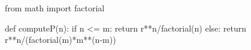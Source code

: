 
from math import factorial

def computeP(n):
    if n <= m:
       return r**n/factorial(n)
    else:
       return r**n/(factorial(m)*m**(n-m))



